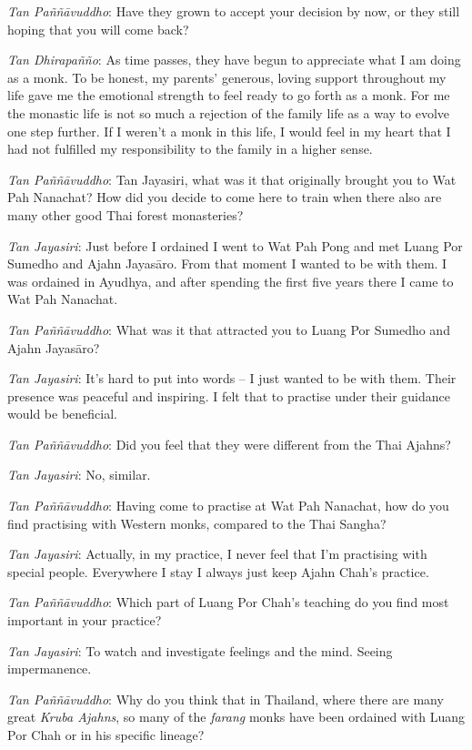 \emph{Tan Paññāvuddho}‎: Have they grown to accept your decision by now,
or they still hoping that you will come back?

\emph{Tan Dhirapañño}‎: As time passes, they have begun to appreciate
what I am doing as a monk. To be honest, my parents' generous, loving
support throughout my life gave me the emotional strength to feel ready
to go forth as a monk. For me the monastic life is not so much a
rejection of the family life as a way to evolve one step further. If I
weren't a monk in this life, I would feel in my heart that I had not
fulfilled my responsibility to the family in a higher sense.

\emph{Tan Paññāvuddho}‎: Tan Jayasiri, what was it that originally
brought you to Wat Pah Nanachat? How did you decide to come here to
train when there also are many other good Thai forest monasteries?

\emph{Tan Jayasiri}: Just before I ordained I went to Wat Pah Pong and
met Luang Por Sumedho and Ajahn Jayasāro. From that moment I wanted to
be with them. I was ordained in Ayudhya, and after spending the first
five years there I came to Wat Pah Nanachat.

\emph{Tan Paññāvuddho}‎: What was it that attracted you to Luang Por
Sumedho and Ajahn Jayasāro?

\emph{Tan Jayasiri}: It's hard to put into words -- I just wanted to be
with them. Their presence was peaceful and inspiring. I felt that to
practise under their guidance would be beneficial.

\emph{Tan Paññāvuddho}‎: Did you feel that they were different from the
Thai Ajahns?

\emph{Tan Jayasiri}: No, similar.

\emph{Tan Paññāvuddho}‎: Having come to practise at Wat Pah Nanachat,
how do you find practising with Western monks, compared to the Thai
Sangha?

\emph{Tan Jayasiri}: Actually, in my practice, I never feel that I'm
practising with special people. Everywhere I stay I always just keep
Ajahn Chah's practice.

\emph{Tan Paññāvuddho}‎: Which part of Luang Por Chah's teaching do you
find most important in your practice?

\emph{Tan Jayasiri}: To watch and investigate feelings and the mind.
Seeing impermanence.

\emph{Tan Paññāvuddho}‎: Why do you think that in Thailand, where there
are many great \emph{Kruba Ajahns‎‎}, so many of the \emph{farang} monks
have been ordained with Luang Por Chah or in his specific lineage?

